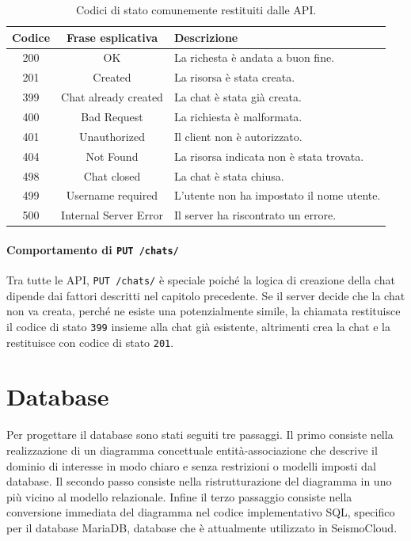 \begin{table}[ht!]
\centering
\caption{Codici di stato comunemente restituiti dalle API.}
\label{tab:codici_stato}

\begin{tabular}{c|c|p{19em}}
\textbf{Codice} & \textbf{Frase esplicativa} & \textbf{Descrizione} \\
\hline
200 & OK & La richesta è andata a buon fine. \\
201 & Created & La risorsa è stata creata. \\
399 & Chat already created & La chat è stata già creata. \\
400 & Bad Request & La richiesta è malformata. \\
401 & Unauthorized & Il client non è autorizzato. \\
404 & Not Found & La risorsa indicata non è stata trovata. \\
498 & Chat closed & La chat è stata chiusa. \\
499 & Username required & L'utente non ha impostato il nome utente. \\
500 & Internal Server Error & Il server ha riscontrato un errore. \\
\end{tabular}
\end{table}

\paragraph{Comportamento di \texttt{PUT /chats/}} Tra tutte le API, \texttt{PUT /chats/} è speciale poiché la logica di creazione della chat dipende dai fattori descritti nel capitolo precedente. Se il server decide che la chat non va creata, perché ne esiste una potenzialmente simile, la chiamata restituisce il codice di stato \texttt{399} insieme alla chat già esistente, altrimenti crea la chat e la restituisce con codice di stato \texttt{201}.

\section{Database}

Per progettare il database sono stati seguiti tre passaggi. Il primo consiste nella realizzazione di un diagramma concettuale entità-associazione che descrive il dominio di interesse in modo chiaro e senza restrizioni o modelli imposti dal database. Il secondo passo consiste nella ristrutturazione del diagramma in uno più vicino al modello relazionale. Infine il terzo passaggio consiste nella conversione immediata del diagramma nel codice implementativo SQL, specifico per il database MariaDB, database che è attualmente utilizzato in SeismoCloud.

